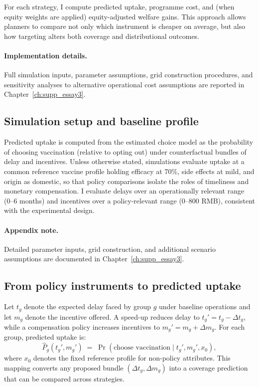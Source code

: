 \documentclass[doublespacing]{utdthesis}
\begin{document}
For each strategy, I compute predicted uptake, programme cost, and (when equity weights are applied) equity-adjusted welfare gains. This approach allows planners to compare not only which instrument is cheaper on average, but also how targeting alters both coverage and distributional outcomes.

\paragraph{Implementation details.}
Full simulation inputs, parameter assumptions, grid construction procedures, and sensitivity analyses to alternative operational cost assumptions are reported in Chapter~\ref{ch:supp_essay3}.


\subsection{Simulation setup and baseline profile}
\label{subsec:essay3_setup}

Predicted uptake is computed from the estimated choice model as the probability of choosing vaccination (relative to opting out) under counterfactual bundles of delay and incentives. Unless otherwise stated, simulations evaluate uptake at a common reference vaccine profile holding efficacy at 70\%, side effects at mild, and origin as domestic, so that policy comparisons isolate the roles of timeliness and monetary compensation. I evaluate delays over an operationally relevant range (0--6 months) and incentives over a policy-relevant range (0--800 RMB), consistent with the experimental design.

\paragraph{Appendix note.}
Detailed parameter inputs, grid construction, and additional scenario assumptions are documented in Chapter~\ref{ch:supp_essay3}.

\subsection{From policy instruments to predicted uptake}
\label{subsec:essay3_uptake_map}

Let $t_g$ denote the expected delay faced by group $g$ under baseline operations and let $m_g$ denote the incentive offered. A speed-up reduces delay to $t_g' = t_g - \Delta t_g$, while a compensation policy increases incentives to $m_g' = m_g + \Delta m_g$. For each group, predicted uptake is:
\begin{equation}
\widehat{P}_g(t_g', m_g') \;=\; \Pr(\text{choose vaccination}\mid t_g', m_g', x_0),
\end{equation}
where $x_0$ denotes the fixed reference profile for non-policy attributes. This mapping converts any proposed bundle $(\Delta t_g,\Delta m_g)$ into a coverage prediction that can be compared across strategies.
\end{document}
